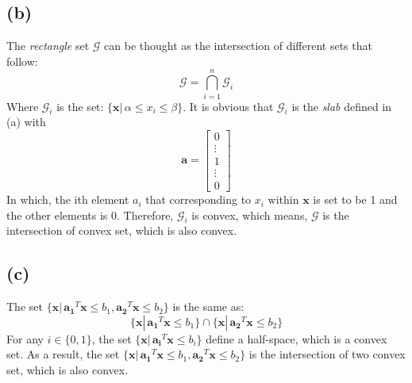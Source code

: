 \documentclass[10pt,a4paper]{article}
\begin{document}
\subsection*{(b)}
The \textit{rectangle} set $\mathcal{G}$ can be thought as the intersection of different sets that follow:
\begin{equation*}
	\mathcal{G} = \displaystyle\bigcap_{i = 1}^{n} \mathcal{G}_{i}
\end{equation*}
Where $\mathcal{G}_{i}$ is the set: $\{ \mathbf{x} |\, \alpha \leq x_{i} \leq \beta \}$. It is obvious that $\mathcal{G}_{i}$ is the \textit{slab} defined in (a) with 
\begin{equation*}
	\mathbf{a} = 
	\begin{bmatrix}
		0 \\
		\vdots \\
		1 \\
		\vdots \\
		0
	\end{bmatrix}
\end{equation*}
In which, the ith element $a_{i}$ that corresponding to $x_{i}$ within $\mathbf{x}$ is set to be 1 and the other elements is 0. Therefore, $\mathcal{G}_{i}$ is convex, which means, $\mathcal{G}$ is the intersection of convex set, which is also convex. 

\subsection*{(c)}
The set $\{ \mathbf{x} |\, \mathbf{a_{1}}^{T} \mathbf{x} \leq b_{1}, \mathbf{a_{2}}^{T} \mathbf{x} \leq b_{2} \}$ is the same as:
\begin{equation*}
\{ \mathbf{x} |\, \mathbf{a_{1}}^{T} \mathbf{x} \leq b_{1} \} \cap \{ \mathbf{x} |\, \mathbf{a_{2}}^{T} \mathbf{x} \leq b_{2} \}
\end{equation*}
For any $i \in \{ 0, 1 \}$, the set $\{ \mathbf{x} |\, \mathbf{a_{i}}^{T} \mathbf{x} \leq b_{i} \}$ define a half-space, which is a convex set. As a result, the set $\{ \mathbf{x} |\, \mathbf{a_{1}}^{T} \mathbf{x} \leq b_{1}, \mathbf{a_{2}}^{T} \mathbf{x} \leq b_{2} \}$ is the intersection of two convex set, which is also convex.
\end{document}
